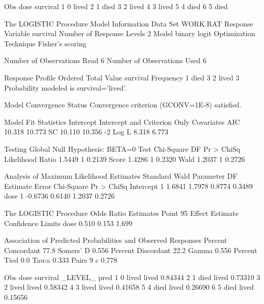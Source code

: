 \documentclass{article}
\begin{document}
\begin{Woutput}
Obs    dose    survival
 1       0      lived
 2       1      died
 3       2      lived
 4       3      lived
 5       4      died
 6       5      died

The LOGISTIC Procedure
              Model Information
Data Set                      WORK.RAT
Response Variable             survival
Number of Response Levels     2
Model                         binary logit
Optimization Technique        Fisher's scoring

Number of Observations Read           6
Number of Observations Used           6

          Response Profile
 Ordered                      Total
   Value     survival     Frequency
       1     died                 3
       2     lived                3
Probability modeled is survival='lived'.

                    Model Convergence Status
         Convergence criterion (GCONV=1E-8) satisfied.

         Model Fit Statistics
                             Intercept
              Intercept            and
Criterion          Only     Covariates
AIC              10.318         10.773
SC               10.110         10.356
-2 Log L          8.318          6.773

        Testing Global Null Hypothesis: BETA=0
Test                 Chi-Square       DF     Pr > ChiSq
Likelihood Ratio         1.5449        1         0.2139
Score                    1.4286        1         0.2320
Wald                     1.2037        1         0.2726

             Analysis of Maximum Likelihood Estimates
                               Standard          Wald
Parameter    DF    Estimate       Error    Chi-Square    Pr > ChiSq
Intercept     1      1.6841      1.7978        0.8774        0.3489
dose          1     -0.6736      0.6140        1.2037        0.2726

The LOGISTIC Procedure
           Odds Ratio Estimates
             Point          95%
Effect    Estimate      Confidence Limits
dose         0.510       0.153       1.699

Association of Predicted Probabilities and Observed Responses
Percent Concordant     77.8    Somers' D    0.556
Percent Discordant     22.2    Gamma        0.556
Percent Tied            0.0    Tau-a        0.333
Pairs                     9    c            0.778

Obs    dose    survival    _LEVEL_      pred
 1       0      lived       lived     0.84344
 2       1      died        lived     0.73310
 3       2      lived       lived     0.58342
 4       3      lived       lived     0.41658
 5       4      died        lived     0.26690
 6       5      died        lived     0.15656
\end{Woutput}
\end{document}
